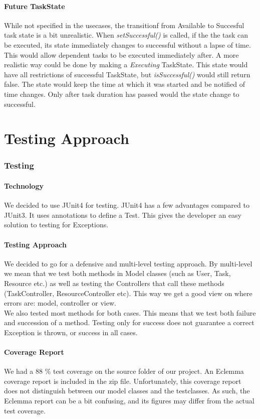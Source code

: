 		\subsection{Future TaskState}
			While not specified in the usecases, the transitionf from Available to Succesful task state is a bit unrealistic. When \emph{setSuccessful()} is called, if the the task can be executed, its state immediately changes to successful without a lapse of time. This would allow dependent tasks to be executed immediately after. A more realistic way could be done by making a \emph{Executing} TaskState. This state would have all restrictions of successful TaskState, but \emph{isSuccessful()} would still return false. The state would keep the time at which it was started and be notified of time changes. Only after task duration has passed would the state change to successful.
		
\part{Testing Approach}
	
	\section{Testing}
		\subsection{Technology}
		We decided to use JUnit4 for testing.
		JUnit4 has a few advantages compared to JUnit3. It uses annotations to define a Test. This gives the developer an easy solution to testing for Exceptions.
		\subsection{Testing Approach}
		We decided to go for a defensive and multi-level testing approach.
		By multi-level we mean that we test both methods in Model classes (such as User, Task, Resource etc.) as well as testing the Controllers that call these methods (TaskController, ResourceController etc). 
		This way we get a good view on where errors are: model, controller or view.\\
		We also tested most methods for both cases. This means that we test both failure and succession of a method. Testing only for success does not guarantee a correct Exception is thrown, or success in all cases.
		\subsection{Coverage Report}
		We had a 88 \% test coverage on the source folder of our project. An Eclemma coverage report is included in the zip file. Unfortunately, this coverage report does not distinguish between our model classes and the testclasses. As such, the Eclemma report can be a bit confusing, and its figures may differ from the actual test coverage.
	
